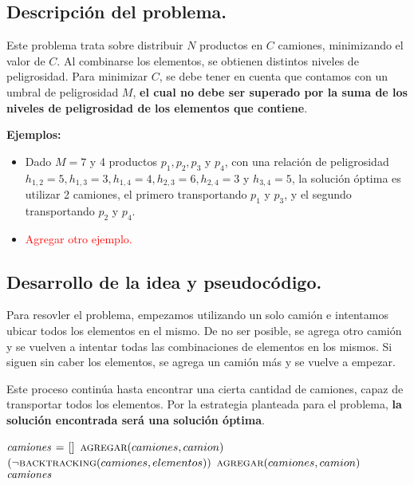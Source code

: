 \subsection{Descripción del problema.}

\vspace*{0.3cm}

Este problema trata sobre distribuir $N$ productos en $C$ camiones, minimizando
el valor de $C$. Al combinarse los elementos, se obtienen distintos niveles de peligrosidad.
Para minimizar $C$, se debe tener en cuenta que contamos con un umbral de peligrosidad
$M$, \textbf{el cual no debe ser superado por la suma de los niveles de peligrosidad de los
elementos que contiene}.

\vspace*{0.5cm}

\textbf{Ejemplos:}
\begin{itemize}
  \item Dado $M = 7$ y 4 productos $p_1, p_2, p_3$ y $p_4$, con una relación
  de peligrosidad $h_{1,2} = 5, h_{1,3} = 3, h_{1,4} = 4, h_{2,3} = 6, h_{2,4} =
  3$ y $h_{3,4} = 5$, la solución óptima es utilizar 2 camiones, el primero
  transportando $p_1$ y $p_3$, y el segundo transportando $p_2$ y $p_4$.
  
  \item \textcolor{red}{Agregar otro ejemplo.}
\end{itemize}



\subsection{Desarrollo de la idea y pseudocódigo.}

Para resovler el problema, empezamos utilizando un solo camión e intentamos ubicar 
todos los elementos en el mismo. De no ser posible, se agrega otro camión y se vuelven 
a intentar todas las combinaciones de elementos en los mismos. Si siguen sin caber los
elementos, se agrega un camión más y se vuelve a empezar.

Este proceso continúa hasta encontrar una cierta cantidad de camiones, capaz de 
transportar todos los elementos. Por la estrategia planteada para el problema, 
\textbf{la solución encontrada será una solución óptima}.

\vspace*{0.5cm}


\begin{codebox}
\li $\id{camiones} \gets []$
\li $\textnormal{\scshape agregar}(camiones, camion)$
\li \While $(\neg\textnormal{\scshape backtracking}(camiones, elementos))$
\li     \Do
            $\textnormal{\scshape agregar}(camiones, camion)$
        \End
\li \Return $\id{camiones}$
\end{codebox}


